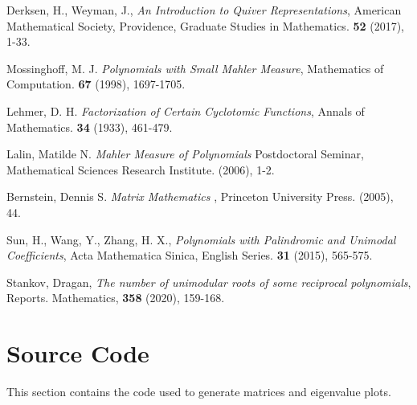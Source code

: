\documentclass{amsart}
\theoremstyle{theorem}
\theoremstyle{theorem*}
\theoremstyle{definition}
\begin{document}
\begin{thebibliography}{99}

     Derksen, H., Weyman, J., {\em An Introduction to Quiver
            Representations\/}, American Mathematical Society, Providence,
    Graduate Studies in Mathematics. {\bf 52} (2017), 1-33.

     Mossinghoff, M. J. {\em Polynomials with Small Mahler
            Measure\/}, Mathematics of Computation. {\bf 67} (1998), 1697-1705.

     Lehmer, D. H. {\em Factorization of Certain Cyclotomic
            Functions\/}, Annals of Mathematics. {\bf 34} (1933), 461-479.

     Lalin, Matilde N. {\em Mahler Measure of Polynomials\/}
    Postdoctoral Seminar, Mathematical Sciences Research Institute. (2006), 1-2.

     Bernstein, Dennis S. {\em Matrix Mathematics \/},
    Princeton University Press. (2005), 44.

     Sun, H., Wang, Y., Zhang, H. X., {\em Polynomials with
    Palindromic and Unimodal Coefficients}, Acta Mathematica Sinica, English
    Series. {\bf 31} (2015), 565-575.

     Stankov, Dragan, {\em The number of unimodular roots of some
    reciprocal polynomials}, Reports. Mathematics, {\bf 358} (2020), 159-168.
\end{thebibliography}
\pagebreak

\appendix

\section{Source Code}

This section contains the code used to generate matrices and eigenvalue plots.

\tiny

\end{document}
